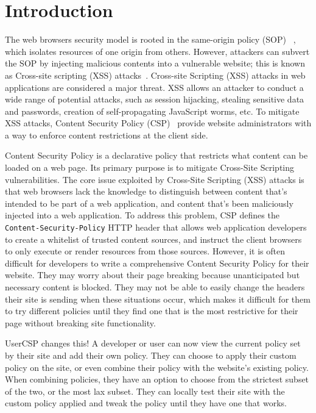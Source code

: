\section{Introduction}
\label{sec:background}

The web browsers security model is rooted in the same-origin policy
(SOP) ~\cite{sop}, which isolates resources of one origin from
others. However, attackers can subvert the SOP by injecting malicious
contents into a vulnerable website; this is known as Cross-site
scripting (XSS) attacks~\cite{xss}. Cross-site Scripting (XSS) attacks
in web applications are considered a major threat. XSS allows an
attacker to conduct a wide range of potential attacks, such as session
hijacking, stealing sensitive data and passwords, creation of
self-propagating JavaScript worms, etc. To mitigate XSS attacks,
Content Security Policy (CSP)~\cite{csp} provide website
administrators with a way to enforce content restrictions at the
client side.

Content Security Policy is a declarative policy that restricts what
content can be loaded on a web page. Its primary purpose is to
mitigate Cross-Site Scripting vulnerabilities.  The core issue
exploited by Cross-Site Scripting (XSS) attacks is that web browsers
lack the knowledge to distinguish between content that's intended to
be part of a web application, and content that's been maliciously
injected into a web application. To address this problem, CSP defines
the {\tt Content-Security-Policy} HTTP header that allows web application
developers to create a whitelist of trusted content sources, and
instruct the client browsers to only execute or render resources from
those sources. However, it is often difficult for developers to write
a comprehensive Content Security Policy for their website. They may
worry about their page breaking because unanticipated but necessary
content is blocked. They may not be able to easily change the headers
their site is sending when these situations occur, which makes it
difficult for them to try different policies until they find one that
is the most restrictive for their page without breaking site
functionality.

UserCSP changes this! A developer or user can now view the current
policy set by their site and add their own policy.  They can choose to
apply their custom policy on the site, or even combine their policy
with the website’s existing policy.  When combining policies, they
have an option to choose from the strictest subset of the two, or the
most lax subset.  They can locally test their site with the custom
policy applied and tweak the policy until they have one that works.

